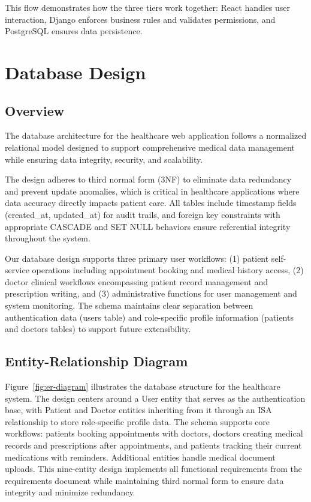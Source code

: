 \documentclass[11pt,a4paper]{article}
\begin{document}
This flow demonstrates how the three tiers work together: React handles user interaction, Django enforces business rules and validates permissions, and PostgreSQL ensures data persistence.
\clearpage

\section{Database Design}

\subsection{Overview}
The database architecture for the healthcare web application follows a normalized relational model designed to support comprehensive medical data management while ensuring data integrity, security, and scalability. 

The design adheres to third normal form (3NF) to eliminate data redundancy and prevent update anomalies, which is critical in healthcare applications where data accuracy directly impacts patient care. All tables include timestamp fields (created\_at, updated\_at) for audit trails, and foreign key constraints with appropriate CASCADE and SET NULL behaviors ensure referential integrity throughout the system.

Our database design supports three primary user workflows: (1) patient self-service operations including appointment booking and medical history access, (2) doctor clinical workflows encompassing patient record management and prescription writing, and (3) administrative functions for user management and system monitoring. The schema maintains clear separation between authentication data (users table) and role-specific profile information (patients and doctors tables) to support future extensibility.


\subsection{Entity-Relationship Diagram}
Figure~\ref{fig:er-diagram} illustrates the database structure for the healthcare system. The design centers around a User entity that serves as the authentication base, with Patient and Doctor entities inheriting from it through an ISA relationship to store role-specific profile data. The schema supports core workflows: patients booking appointments with doctors, doctors creating medical records and prescriptions after appointments, and patients tracking their current medications with reminders. Additional entities handle medical document uploads. This nine-entity design implements all functional requirements from the requirements document while maintaining third normal form to ensure data integrity and minimize redundancy.
\end{document}
